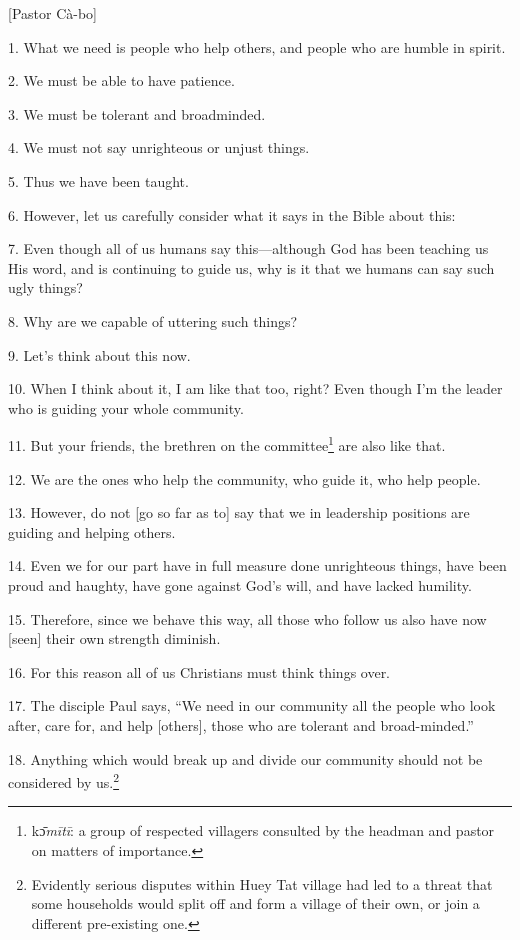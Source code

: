 \setcounter{footnote}{0}

[Pastor Cà-bo]

1. What we need is people who help others, and people who are humble in spirit.

2. We must be able to have patience.

3. We must be tolerant and broadminded.

4. We must not say unrighteous or unjust things.

5. Thus we have been taught.

6. However, let us carefully consider what it says in the Bible about this:

7. Even though all of us humans say this---although God has been teaching us His
word, and is continuing to guide us, why is it that we humans can say such ugly
things?

8. Why are we capable of uttering such things?

9. Let's think about this now.

10. When I think about it, I am like that too, right? Even though I'm the leader
who is guiding your whole community.

11. But your friends, the brethren on the committee\footnote{kɔ̄\textit{mītī}: a group of respected villagers consulted by the headman and pastor on matters of importance.} are also like that.

12. We are the ones who help the community, who guide it, who help people.

13. However, do not [go so far as to] say that we in leadership positions are guiding
and helping others.

14. Even we for our part have in full measure done unrighteous things, have been
proud and haughty, have gone against God's will, and have lacked humility.

15. Therefore, since we behave this way, all those who follow us also have now
[seen] their own strength diminish.

16. For this reason all of us Christians must think things over.

17. The disciple Paul says, ``We need in our community all the people who look
after, care for, and help [others], those who are tolerant and broad-minded.''

18. Anything which would break up and divide our community should not be considered
by us.\footnote{Evidently serious disputes within Huey Tat village had led to a threat that some households would split off and form a village of their own, or join a different pre-existing one.}

